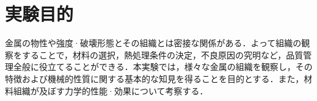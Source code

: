 \section{実験目的}
金属の物性や強度·破壊形態とその組織とは密接な関係がある．よって組織の観察をすることで，材料の選択，熱処理条件の決定，不良原因の究明など，品質管理全般に役立てることができる．本実験では，様々な金属の組織を観察し，その特徴および機械的性質に関する基本的な知見を得ることを目的とする．また，材料組織が及ぼす力学的性能·効果について考察する．
